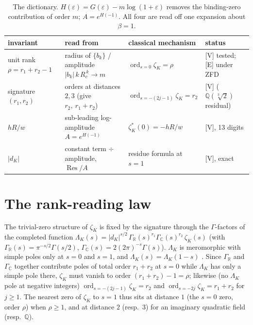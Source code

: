 \documentclass[a4paper,11pt]{article}
\theoremstyle{plain}
\theoremstyle{definition}
\theoremstyle{remark}
\newcommand{\eps}{\varepsilon}
\newcommand{\Q}{\mathbb{Q}}
\newcommand{\R}{\mathbb{R}}
\newcommand{\C}{\mathbb{C}}
\newcommand{\Res}{\operatorname{Res}}
\newcommand{\ord}{\operatorname{ord}}
\begin{document}
\begin{table}[h]\centering
\begin{tabular}{@{}llll@{}}
\toprule
invariant & read from & classical mechanism & status\\
\midrule
unit rank $\rho=r_1+r_2-1$ & radius of $\{b_k\}$ / amplitude $|b_k|\,k\,R_c^{\,k}\to m$ & $\ord_{s=0}\zeta_K=\rho$ & [V] tested; [E] under ZFD\\
signature $(r_1,r_2)$ & orders at distances $2,3$ (give $r_2,\ r_1{+}r_2$) & $\ord_{s=-(2j-1)}\zeta_K=r_2$ & [V] ($\Q(\sqrt[3]2)$ residual)\\
$hR/w$ & sub-leading log-amplitude $A=e^{H(-1)}$ & $\zeta_K^*(0)=-hR/w$ & [V], 13 digits\\
$|d_K|$ & constant term $\div$ amplitude, $\Res/A$ & residue formula at $s=1$ & [V], exact\\
\bottomrule
\end{tabular}
\caption{The dictionary. $H(\eps)=G(\eps)-m\log(1+\eps)$ removes the binding-zero contribution of order
$m$; $A=e^{H(-1)}$. All four are read off one expansion about $\beta=1$.}\label{tab:dict}
\end{table}

\section{The rank-reading law}\label{sec:rank}
The trivial-zero structure of $\zeta_K$ is fixed by the signature through the $\Gamma$-factors of the
completed function $\Lambda_K(s)=|d_K|^{s/2}\,\Gamma_\R(s)^{r_1}\Gamma_\C(s)^{r_2}\,\zeta_K(s)$
(with $\Gamma_\R(s)=\pi^{-s/2}\Gamma(s/2)$, $\Gamma_\C(s)=2(2\pi)^{-s}\Gamma(s)$). $\Lambda_K$ is meromorphic
with simple poles only at $s=0$ and $s=1$, and $\Lambda_K(s)=\Lambda_K(1-s)$ \cite{neukirch}. Since
$\Gamma_\R$ and $\Gamma_\C$ together contribute poles of total order $r_1+r_2$ at $s=0$ while $\Lambda_K$ has
only a simple pole there, $\zeta_K$ must vanish to order $(r_1+r_2)-1=\rho$; likewise (no $\Lambda_K$ pole at
negative integers) $\ord_{s=-(2j-1)}\zeta_K=r_2$ and $\ord_{s=-2j}\zeta_K=r_1+r_2$ for $j\ge1$. The nearest
zero of $\zeta_K$ to $s=1$ thus sits at distance $1$ (the $s=0$ zero, order $\rho$) when $\rho\ge1$, and at
distance $2$ (resp.\ $3$) for an imaginary quadratic field (resp.\ $\Q$).
\end{document}
